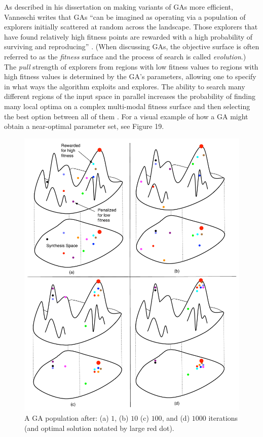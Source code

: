 \documentclass[12pt]{report} 	%
\numberwithin{figure}{chapter}
\numberwithin{table}{chapter}
\numberwithin{equation}{chapter}
\begin{document}
\begin{flushleft}
As described in his dissertation on making variants of GAs more efficient, Vanneschi writes that GAs ``can be imagined as operating via a population of explorers initially scattered at random across the landscape. Those explorers that have found relatively high fitness points are rewarded with a high probability of surviving and reproducing'' \cite[p. 70]{Vanneschi:2004le}. (When discussing GAs, the objective surface is often referred to as the \textit{fitness} surface and the process of search is called \textit{evolution}.) The \textit{pull} strength of explorers from regions with low fitness values to regions with high fitness values is determined by the GA's parameters, allowing one to specify in what ways the algorithm exploits and explores. The ability to search many different regions of the input space in parallel increases the probability of finding many local optima on a complex multi-modal fitness surface and then selecting the best option between all of them \cite[p. 37]{Garcia:2001jw}. For a visual example of how a GA might obtain a near-optimal parameter set, see Figure 19.
\begin{figure}[h!]
\vspace{24pt}
\begin{center}
\includegraphics[scale=0.50]{GASearch}
\caption[GA example]{A GA population after: (a) $1$, (b) $10$ (c) $100$, and (d) $1000$ iterations (and optimal solution notated by large red dot).}
\end{center}
\vspace{6pt}
\end{figure}


\end{flushleft}
\end{document}
